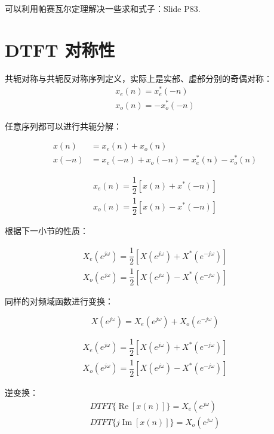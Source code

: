 \documentclass[cn,11pt,chinese,black,simple]{elegantbook}
\begin{document}
可以利用帕赛瓦尔定理解决一些求和式子：Slide P83.



\section{DTFT 对称性}

共轭对称与共轭反对称序列定义，实际上是实部、虚部分别的奇偶对称： \[
    \begin{array}{l}
    x_{e}(n)=x_{e}^{*}(-n) \\
    x_{o}(n)=-x_{o}^{*}(-n)
    \end{array}
\]

任意序列都可以进行共轭分解：

\[\begin{aligned}
    x(n) &= x_e(n) + x_o(n) \\ 
    x(-n) &= x_e(-n) + x_o(-n) = x_e^*(n) - x_o^*(n) 
\end{aligned}\]

\[
\begin{array}{l}
x_{e}(n)=\dfrac{1}{2}\left[x(n)+x^{*}(-n)\right] \\
x_{o}(n)=\dfrac{1}{2}\left[x(n)-x^{*}(-n)\right]
\end{array}
\]

根据下一小节的性质：

\[
\begin{array}{l}
X_{e}\left(e^{j \omega}\right)=\dfrac{1}{2}\left[X\left(e^{j \omega}\right)+X^{*}\left(e^{-j \omega}\right)\right] \\
X_{o}\left(e^{j \omega}\right)=\dfrac{1}{2}\left[X\left(e^{j \omega}\right)-X^{*}\left(e^{-j \omega}\right)\right]
\end{array}
\]

同样的对频域函数进行变换：

\[X(e^{j\omega}) = X_e(e^{j\omega}) + X_o(e^{-j\omega})\] 

\[
\begin{array}{l}
X_{e}\left(e^{j \omega}\right)=\dfrac{1}{2}\left[X\left(e^{j \omega}\right)+X^{*}\left(e^{-j \omega}\right)\right] \\
X_{o}\left(e^{j \omega}\right)=\dfrac{1}{2}\left[X\left(e^{j \omega}\right)-X^{*}\left(e^{-j \omega}\right)\right]
\end{array}
\]

逆变换：
\[
\begin{array}{l}
D T F T\{\operatorname{Re}[x(n)]\}=X_{e}\left(e^{j \omega}\right) \\
D T F T\{j \operatorname{Im}[x(n)]\}=X_{o}\left(e^{j \omega}\right)
\end{array}
\]
\end{document}
